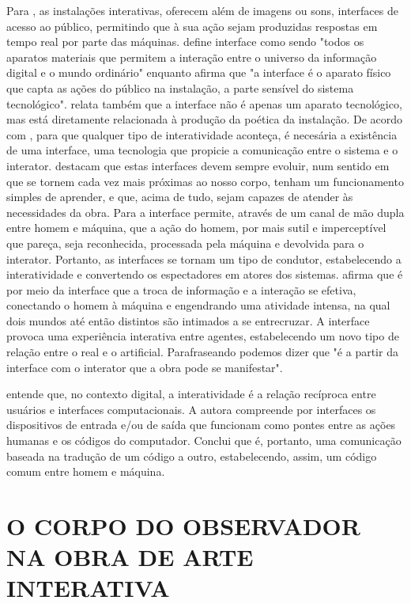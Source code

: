 Para , as instalações interativas, oferecem além de imagens ou sons, interfaces de acesso ao público, permitindo que à sua ação sejam produzidas respostas em tempo real por parte das máquinas.  define interface como sendo "todos os aparatos materiais que permitem a interação entre o universo da informação digital e o mundo ordinário" enquanto  afirma que "a interface é o aparato físico que capta as ações do público na instalação, a parte sensível do sistema tecnológico".  relata também que a interface não é apenas um aparato tecnológico, mas está diretamente relacionada à produção da poética da instalação. De acordo com , para que qualquer tipo de interatividade aconteça, é necesária a existência de uma interface, uma tecnologia que propicie a comunicação entre o sistema e o interator.  destacam que estas interfaces devem sempre evoluir, num sentido em que se tornem cada vez mais próximas ao nosso corpo, tenham um funcionamento simples de aprender, e que, acima de tudo, sejam capazes de atender às necessidades da obra. Para  a interface permite, através de um canal de mão dupla entre homem e máquina, que a ação do homem, por mais sutil e imperceptível que pareça, seja reconhecida, processada pela máquina e devolvida para o interator. Portanto, as interfaces se tornam um tipo de condutor, estabelecendo a interatividade e convertendo os espectadores em atores dos sistemas.  afirma que é por meio da interface que a troca de informação e a interação se efetiva, conectando o homem à máquina e engendrando uma atividade intensa, na qual dois mundos até então distintos são intimados a se entrecruzar. A interface provoca uma experiência interativa entre agentes, estabelecendo um novo tipo de relação entre o real e o artificial. Parafraseando  podemos dizer que "é a partir da interface com o interator que a obra pode se manifestar". 

 entende que, no contexto digital, a interatividade é a relação recíproca entre usuários e interfaces computacionais. A autora compreende por interfaces os dispositivos de entrada e/ou de saída que funcionam como pontes entre as ações humanas e os códigos do computador. Conclui que é, portanto, uma comunicação baseada na tradução de um código a outro, estabelecendo, assim, um código comum entre homem e máquina. 


\section{O CORPO DO OBSERVADOR NA OBRA DE ARTE INTERATIVA}
	
